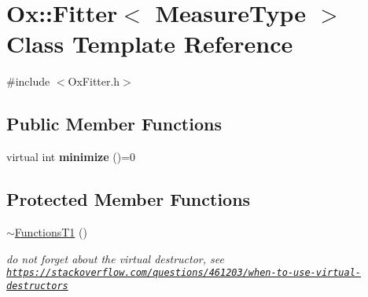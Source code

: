 \hypertarget{class_ox_1_1_fitter}{}\section{Ox\+:\+:Fitter$<$ Measure\+Type $>$ Class Template Reference}
\label{class_ox_1_1_fitter}


{\ttfamily \#include $<$Ox\+Fitter.\+h$>$}

\subsection*{Public Member Functions}
\begin{DoxyCompactItemize}
\item 
\mbox{\label{class_ox_1_1_fitter_add5c56e4b0e193c609b22a7780131b68}} 
virtual int {\bfseries minimize} ()=0
\end{DoxyCompactItemize}
\subsection*{Protected Member Functions}
\begin{DoxyCompactItemize}
\item 
\mbox{\label{class_ox_1_1_fitter_ac1e2ca7fa4a206fc3f684dd5732f4949}} 
\mbox{\hyperlink{class_ox_1_1_fitter_ac1e2ca7fa4a206fc3f684dd5732f4949}{$\sim$\+Functions\+T1}} ()
\begin{DoxyCompactList}\small\item\em do not forget about the virtual destructor, see \href{https://stackoverflow.com/questions/461203/when-to-use-virtual-destructors}{\tt https\+://stackoverflow.\+com/questions/461203/when-\/to-\/use-\/virtual-\/destructors} \end{DoxyCompactList}\end{DoxyCompactItemize}
